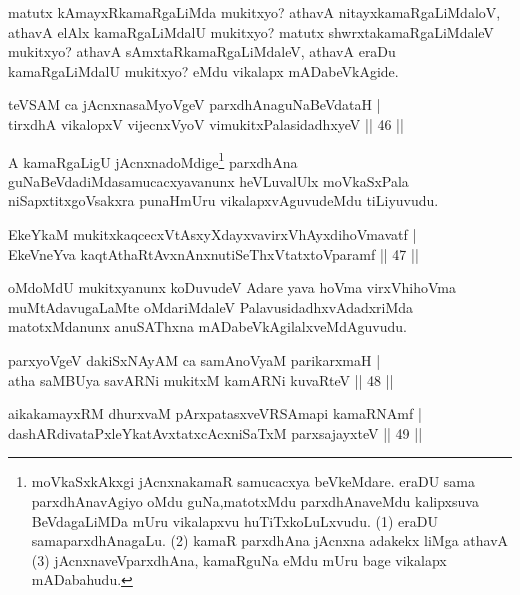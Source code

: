 \begin{artha}
matutx kAmayxRkamaRgaLiMda mukitxyo? athavA nitayxkamaRgaLiMdaloV, athavA elAlx kamaRgaLiMdalU mukitxyo? matutx shwrxtakamaRgaLiMdaleV mukitxyo? athavA sAmxtaRkamaRgaLiMdaleV, athavA eraDu kamaRgaLiMdalU mukitxyo? eMdu vikalapx mADabeVkAgide. 
\end{artha}

\begin{shl}
teVSAM ca jAcnxnasaMyoVgeV parxdhAnaguNaBeVdataH |\\
tirxdhA vikalopxV vijecnxVyoV vimukitxPalasidadhxyeV \hfill || 46 ||
\end{shl}

\begin{artha}
A kamaRgaLigU jAcnxnadoMdige\footnote{moVkaSxkAkxgi jAcnxnakamaR samucacxya beVkeMdare. eraDU sama parxdhAnavAgiyo oMdu guNa,matotxMdu parxdhAnaveMdu kalipxsuva BeVdagaLiMDa mUru vikalapxvu huTiTxkoLuLxvudu. (1) eraDU samaparxdhAnagaLu. (2) kamaR parxdhAna jAcnxna adakekx liMga athavA (3) jAcnxnaveVparxdhAna, kamaRguNa eMdu mUru bage vikalapx mADabahudu.} parxdhAna guNaBeVdadiMda\break samucacxyavanunx heVLuvalUlx moVkaSxPala niSapxtitxgoVsakxra punaH\break mUru vikalapxvAguvudeMdu tiLiyuvudu.
\end{artha}


\begin{shl}
EkeYkaM mukitxkaqcecxVtAsxyXdayxvavirxVhAyxdihoVmavatf |\\
EkeVneYva kaqtAthaRtAvxnAnxnutiSeThxVtatxtoV\s paramf \hfill || 47 ||
\end{shl}

\begin{artha}
oMdoMdU mukitxyanunx koDuvudeV Adare yava hoVma virxVhihoVma muMtAdavugaLaMte oMdariMdaleV PalavusidadhxvAdadx\-\break riMda matotxMdanunx anuSAThxna mADabeVkAgilalxveMdAguvudu.
\end{artha}

\begin{shl}
parxyoVgeV dakiSxNAyAM ca samAnoV\s yaM parikarxmaH |\\
atha saMBUya savARNi mukitxM kamARNi kuvaRteV \hfill || 48 ||
\end{shl}

\begin{shl}
aikakamayxRM dhurxvaM pArxpatasxveVRSAmapi kamaRNAmf |\\
dashARdivataPxleYkatAvxtatxcAcxniSaTxM parxsajayxteV \hfill || 49 ||
\end{shl}

